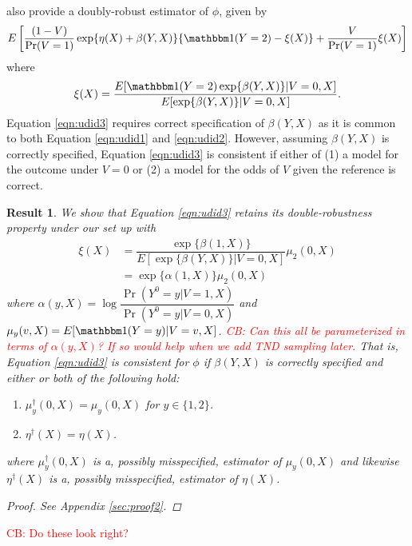 \documentclass[12pt]{article}
\newtheorem{result}{Result}
\begin{document}
\textcite{tchetgen_universal_2023} also provide a doubly-robust estimator of $\phi$, given by 
\begin{equation}\label{eqn:udid3}
     E\left[\dfrac{(1 - V)}{\Pr(V=1)} \exp\{\eta(X) + \beta(Y,X)\}\{\mathbbm 1(Y = 2) - \xi(X)\} + \dfrac{V}{\Pr(V=1)}\xi(X)  \right]
\end{equation}
where 
\[\xi(X) = \dfrac{E[\mathbbm 1(Y=2)\exp\{\beta(Y,X)\} | V = 0, X]}{E[\exp\{\beta(Y,X)\} | V = 0, X]}.\]
Equation \ref{eqn:udid3} requires correct specification of $\beta(Y, X)$ as it is common to both Equation \ref{eqn:udid1} and  \ref{eqn:udid2}.  However, assuming $\beta(Y,X)$ is correctly specified, Equation \ref{eqn:udid3} is consistent if either of (1) a model for the outcome under $V=0$ or (2) a model for the odds of $V$ given the reference is correct. 

\begin{result}\label{res2}
    We show that Equation \ref{eqn:udid3} retains its double-robustness property under our set up with
    \begin{align*}
        \xi(X) &= \dfrac{\exp\{\beta(1,X)\}}{E[\exp\{\beta(Y,X)\} | V = 0, X]}\mu_2(0,X) \\
            &= \exp\{\alpha(1,X)\}\mu_2(0,X)
    \end{align*}
    where $\alpha(y, X) = \log \dfrac{\Pr(Y^0=y|V=1,X)}{\Pr(Y^0=y|V=0,X)}$ and $\mu_y(v,X) = E[\mathbbm 1 (Y= y) | V = v, X]$. \textcolor{red}{CB: Can this all be parameterized in terms of $\alpha(y,X)$? If so would help when we add TND sampling later.} That is, Equation \ref{eqn:udid3} is consistent for $\phi$ if $\beta(Y,X)$ is correctly specified and either or both of the following hold:
    \begin{enumerate}
        \item $\mu_y^\dagger(0,X) = \mu_y(0,X)$ for $y \in \{1, 2\}$.
        \item $\eta^\dagger(X) = \eta(X)$.
    \end{enumerate}
    where  $\mu_y^\dagger(0,X)$ is a, possibly misspecified, estimator of $\mu_y(0,X)$ and likewise $\eta^\dagger(X)$ is a, possibly misspecified, estimator of $\eta(X)$.
    \begin{proof}
        See Appendix \ref{sec:proof2}.
    \end{proof}
\end{result}
\newpage 
\textcolor{red}{CB: Do these look right?}
\end{document}

